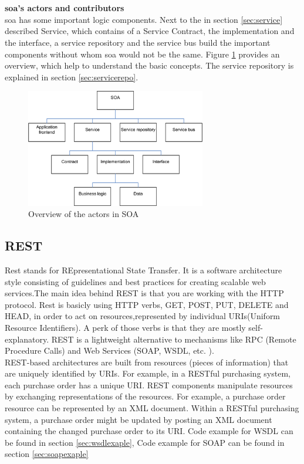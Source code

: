 \documentclass[12pt]{article}
\begin{document}
\\ \\\textbf{\gls{soa}'s actors and contributors}\\
\gls{soa} has some important logic components. Next to the in section \ref{sec:service} described Service, which contains of a Service Contract, the implementation and the interface, a service repository and the service bus build the important components without whom \gls{soa} would not be the same. Figure \ref{fig:actorsSoa} provides an overview, which help to understand the basic concepts. The service repository is explained in section \ref{sec:servicerepo}.
	\begin{figure}[here!]
	\centering
	\includegraphics[width=0.7\textwidth]{images/arg2}
	\caption{Overview of the actors in SOA \cite{arg2}}
	\label{fig:actorsSoa}
	\end{figure}
	\FloatBarrier
	\newpage
\subsection{REST}
Rest stands for REpresentational State Transfer. It is a software architecture style consisting of guidelines and best practices 
for creating scalable web services.The main idea behind REST is that you are working with the HTTP protocol. Rest is basicly using HTTP verbs, GET, POST, PUT, DELETE and HEAD, in order to act on resources,represented by individual URIs(Uniform Resource Identifiers). 
A perk of those verbs is that they are mostly self-explanatory. REST is a lightweight alternative to mechanisms like RPC (Remote Procedure Calls) and Web Services (SOAP, WSDL, etc. ). \\
REST-based architectures are built from resources (pieces of information) that are uniquely identified by URIs. For example, in a RESTful purchasing system, each purchase order has a unique URI.
REST components manipulate resources by exchanging representations of the resources. For example, a purchase order resource can be represented by an XML document. Within a RESTful purchasing system, a purchase order might be updated by posting an XML document containing the changed purchase order to its URI.
Code example for WSDL can be found in section \ref{sec:wsdlexaple}, 
Code example for SOAP can be found in section \ref{sec:soapexaple}
\end{document}
